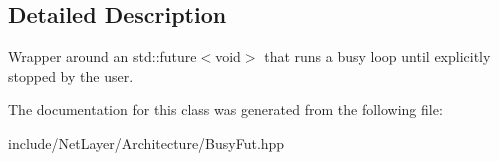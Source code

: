 \subsection{Detailed Description}
Wrapper around an {\ttfamily std\+::future$<$void$>$} that runs a busy loop until explicitly stopped by the user. 

The documentation for this class was generated from the following file\+:\begin{DoxyCompactItemize}
\item 
include/\+Net\+Layer/\+Architecture/Busy\+Fut.\+hpp\end{DoxyCompactItemize}
